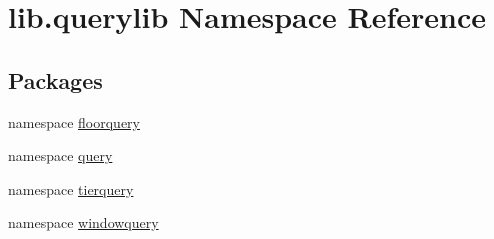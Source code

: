 \hypertarget{namespacelib_1_1querylib}{\section{lib.\-querylib Namespace Reference}
\label{namespacelib_1_1querylib}
}
\subsection*{Packages}
\begin{DoxyCompactItemize}
\item 
namespace \hyperlink{namespacelib_1_1querylib_1_1floorquery}{floorquery}
\item 
namespace \hyperlink{namespacelib_1_1querylib_1_1query}{query}
\item 
namespace \hyperlink{namespacelib_1_1querylib_1_1tierquery}{tierquery}
\item 
namespace \hyperlink{namespacelib_1_1querylib_1_1windowquery}{windowquery}
\end{DoxyCompactItemize}
